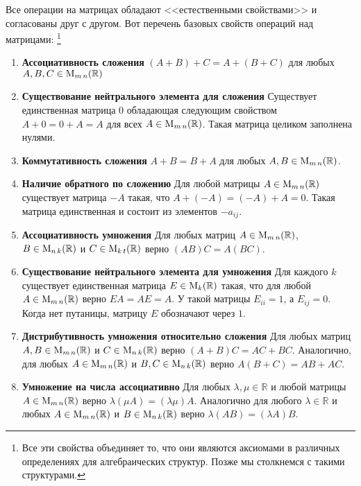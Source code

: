 Все операции на матрицах обладают <<естественными свойствами>> и согласованы друг с другом.
Вот перечень базовых свойств операций над матрицами:%
\footnote{Все эти свойства объединяет то, что они являются аксиомами в различных определениях для алгебраических структур.
Позже мы столкнемся с такими структурами.}
\begin{enumerate}
\item {\bf Ассоциативность сложения}
$(A + B) + C = A + (B + C)$ для любых $A,B,C\in \operatorname{M}_{m\,n}(\mathbb R)$

\item {\bf Существование нейтрального элемента для сложения}
Существует единственная матрица $0$ обладающая следующим свойством $A + 0 = 0 + A = A$ для всех $A\in\operatorname{M}_{m\,n}(\mathbb R)$.
Такая матрица целиком заполнена нулями.

\item {\bf Коммутативность сложения}
$A + B = B + A$ для любых $A,B\in\operatorname{M}_{m\,n}(\mathbb R)$.

\item {\bf Наличие обратного по сложению}
Для любой матрицы $A\in\operatorname{M}_{m\,n}(\mathbb R)$ существует матрица $-A$ такая, что $A + (-A) = (-A) + A = 0$.
Такая матрица единственная и состоит из элементов $-a_{ij}$.

\item {\bf Ассоциативность умножения}
Для любых матриц $A\in\operatorname{M}_{m\,n}(\mathbb R)$, $B\in\operatorname{M}_{n\,k}(\mathbb R)$ и $C\in\operatorname{M}_{k\,t}(\mathbb R)$ верно $(AB)C = A(BC)$.

\item {\bf Существование нейтрального элемента для умножения}
Для каждого $k$ существует единственная матрица $E\in\operatorname{M}_{k}(\mathbb R)$ такая, что для любой $A\in\operatorname{M}_{m\,n}(\mathbb R)$ верно $E A = A E = A$.
У такой матрицы $E_{ii} = 1$, а $E_{ij} = 0$.
Когда нет путаницы, матрицу $E$ обозначают через $1$.

\item {\bf Дистрибутивность умножения относительно сложения}
Для любых матриц $A,B\in\operatorname{M}_{m\,n}(\mathbb R)$ и $C\in\operatorname{M}_{n\,k}(\mathbb R)$ верно $(A + B)C = AC + B C$.
Аналогично, для любых $A\in\operatorname{M}_{m\,n}(\mathbb R)$ и $B,C\in\operatorname{M}_{n\,k}(\mathbb R)$ верно $A(B+C) = AB + AC$.

\item {\bf Умножение на числа ассоциативно}
Для любых $\lambda,\mu \in\mathbb R$ и любой матрицы $A\in\operatorname{M}_{m\,n}(\mathbb R)$ верно $\lambda(\mu A) = (\lambda \mu) A$.
Аналогично для любого $\lambda \in \mathbb R$ и любых $A\in\operatorname{M}_{m\,n}(\mathbb R)$ и $B\in \operatorname{M}_{n\,k}(\mathbb R)$ верно $\lambda(AB) = (\lambda A) B$.


\end{enumerate}
